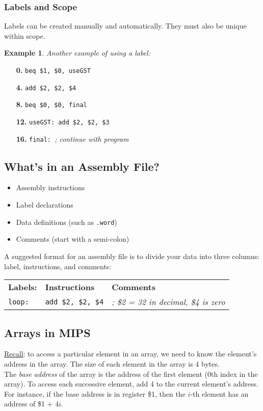 \documentclass{report}
\newtheorem{ex}{Example}[section]
\begin{document}
\subsubsection{Labels and Scope}
Labels can be created manually and automatically. They must also be unique within scope.
\begin{ex}
Another example of using a label:
\end{ex}
\begin{itemize}
\item[\textbf{0.}] \texttt{beq \$1, \$0, useGST}
\item[\textbf{4.}] \texttt{add \$2, \$2, \$4}
\item[\textbf{8.}] \texttt{beq \$0, \$0, final}
\item[\textbf{12.}] \texttt{useGST: add \$2, \$2, \$3}
\item[\textbf{16.}] \texttt{final: }\textit{; continue with program}
\end{itemize}
\subsection{What's in an Assembly File?}
\begin{itemize}
\item Assembly instructions
\item Label declarations
\item Data definitions (such as \texttt{.word})
\item Comments (start with a semi-colon)
\end{itemize}
A suggested format for an assembly file is to divide your data into three columns: label, instructions, and comments:
\begin{center}
\begin{tabular}{ l l l }
\textbf{Labels:} & \textbf{Instructions} & \textbf{Comments} \\
\texttt{loop:} & \texttt{add \$2, \$2, \$4} & \textit{; \$2 = 32 in decimal, \$4 is zero}
\end{tabular}
\end{center}
\subsection{Arrays in MIPS}
\underline{Recall}: to access a particular element in an array, we need to know the element's address in the array. The size of each element in the array is 4 bytes.\\
The \textit{base address} of the array is the address of the first element (0th index in the array). To access each successive element, add 4 to the current element's address. For instance, if the base address is in register \$1, then the $i$-th element has an address of \$1 + 4$i$.
\end{document}
